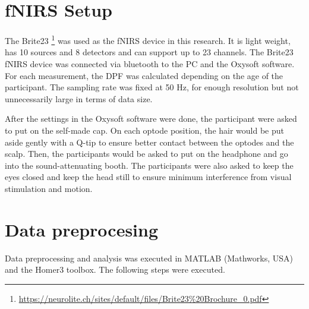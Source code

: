 \section {fNIRS Setup}
The Brite23 \footnote {\url{https://neurolite.ch/sites/default/files/Brite23\%20Brochure_0.pdf}} was used as the fNIRS device in this research. It is light weight, has 10 sources and 8 detectors and can support up to 23 channels. The Brite23 fNIRS device was connected via bluetooth to the PC and the Oxysoft software. For each measurement, the DPF was calculated depending on the age of the participant. The sampling rate was fixed at 50 Hz, for enough resolution but not unnecessarily large in terms of data size.

After the settings in the Oxysoft software were done, the participant were asked to put on the self-made cap. On each optode position, the hair would be put aside gently with a Q-tip to ensure better contact between the optodes and the scalp. Then, the participants would be asked to put on the headphone and go into the sound-attenuating booth. The participants were also asked to keep the eyes closed and keep the head still to ensure minimum interference from visual stimulation and motion.


\section {Data preprocesing}
Data preprocessing and analysis was executed in MATLAB (Mathworks, USA) and the Homer3 toolbox. The following steps were executed.

